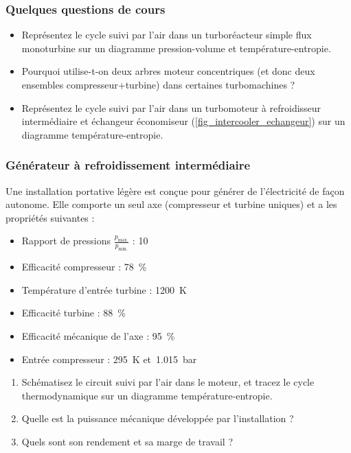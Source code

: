 \begin{boiboiboite}
	\propair
	\propgaz
	\isentropiques
\end{boiboiboite}

\subsubsection{Quelques questions de cours}

	\begin{itemize}
		\item Représentez le cycle suivi par l’air dans un turboréacteur simple flux monoturbine sur un diagramme pression-volume et température-entropie.
		\item Pourquoi utilise-t-on deux arbres moteur concentriques (et donc deux ensembles compresseur+turbine) dans certaines turbomachines ?
		\item Représentez le cycle suivi par l’air dans un turbomoteur à refroidisseur intermédiaire et échangeur économiseur (\cref{fig_intercooler_echangeur}) sur un diagramme température-entropie.
	\end{itemize}


\subsubsection{Générateur à refroidissement intermédiaire}

	Une installation portative légère est conçue pour générer de l’électricité de façon autonome. Elle comporte un seul axe (compresseur et turbine uniques) et a les propriétés suivantes :
	\begin{itemize}
		\item Rapport de pressions $\frac{p_\text{max.}}{p_\text{min.}}$ :  	\tab \num{10}
		\item Efficacité compresseur :  									\tab \SI{78}{\percent}
		\item Température d’entrée turbine : 							\tab \SI{1200}{\kelvin}
		\item Efficacité turbine : 										\tab \SI{88}{\percent}
		\item Efficacité mécanique de l’axe : 							\tab \SI{95}{\percent}
		\item Entrée compresseur : 										\tab \SI{295}{\kelvin} et~\SI{1,015}{\bar}
	\end{itemize}

	\begin{enumerate}
		\item Schématisez le circuit suivi par l’air dans le moteur, et tracez le cycle thermodynamique sur un diagramme température-entropie.
		\item Quelle est la puissance mécanique développée par l’installation ?
		\item Quels sont son rendement et sa marge de travail ?
	\end{enumerate}
	
